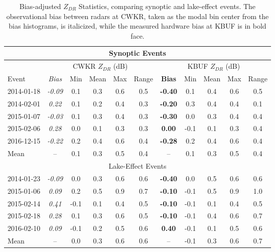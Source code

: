 \begin{table}[H]
    \caption{Bias-adjusted $Z_{DR}$ Statistics, comparing synoptic and lake-effect events. The observational bias between radars at CWKR, taken as the modal bin center from the bias histograms, is italicized, while the measured hardware bias at KBUF is in bold face.}\label{eventcompare}
    \begin{center}
    \begin{tabular}{|l|c|c|c|c|c|c|c|c|c|c|}
    \hline 
    \multicolumn{11}{|c|}{Synoptic Events} \\
    \hline
     &
    \multicolumn{5}{|c|}{CWKR $Z_{DR}$ (dB)} & 
    \multicolumn{5}{|c|}{KBUF $Z_{DR}$ (dB)} \\
    \hline 
     Event & \textit{Bias} & Min & Mean & Max & Range & \textbf{Bias} & Min & Mean & Max & Range\\
    \hline\hline
    2014-01-18 & \textit{-0.09} & 0.1 & 0.3 & 0.6 & 0.5 & \textbf{-0.40} & 0.1 & 0.4 & 0.6 & 0.5 \\
    \hline
    2014-02-01 & \textit{0.22} & 0.1 & 0.2 & 0.4 & 0.3 & \textbf{-0.20} & 0.3 & 0.4 & 0.4 & 0.1 \\    
    \hline
    2015-01-07 & \textit{-0.03} & 0.1 & 0.3 & 0.4 & 0.3 & \textbf{-0.30} & 0.0 & 0.3 & 0.4 & 0.4 \\ 
    \hline
    2015-02-06 & \textit{0.28} & 0.0 & 0.1 & 0.3 & 0.3 & \textbf{0.00} & -0.1 & 0.1 & 0.3 & 0.4\\
    \hline
    2016-12-15 & \textit{-0.22} & 0.2 & 0.4 & 0.6 & 0.4 & \textbf{-0.28} & 0.2 & 0.4 & 0.6 & 0.4  \\ 
    \hline 
    Mean  & -- & 0.1 & 0.3 & 0.5 & 0.4 & -- & 0.1 & 0.3 & 0.5 & 0.4 \\
    \hline
    \multicolumn{11}{|c|}{Lake-Effect Events} \\
    \hline\hline
    2014-01-23 & \textit{-0.09} & 0.0 & 0.3 & 0.6 & 0.6 & \textbf{-0.40} & 0.0 & 0.5 & 0.6 & 0.6\\
    \hline
    2015-01-06 & \textit{0.09} & 0.2 & 0.5 & 0.9 & 0.7 & \textbf{-0.10} & -0.1 & 0.5 & 0.9 & 1.0 \\
    \hline
    2015-02-14 & \textit{0.41} & -0.1 & 0.1 & 0.4 & 0.5 & \textbf{-0.10} & -0.1 & 0.1 & 0.4 & 0.5 \\
    \hline
    2015-02-18 & \textit{0.28} & 0.1 & 0.3 & 0.6 & 0.5 & \textbf{-0.10} & -0.1 & 0.4 & 0.6 & 0.7 \\ 
    \hline
    2016-02-10 & \textit{0.09} & -0.1 & 0.2 & 0.5 & 0.6 & \textbf{0.40} & -0.1 & 0.1 & 0.5 & 0.6  \\ 
    \hline\hline
    Mean & -- & 0.0 & 0.3 & 0.6 & 0.6 & -- & -0.1 & 0.3 & 0.6 & 0.7 \\
    \hline
    \end{tabular}
    \end{center}
\end{table}

